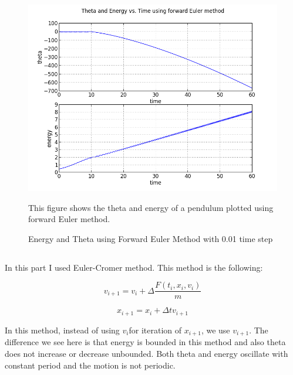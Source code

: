 \documentclass[letterpaper,12pt]{article}
\begin{document}
\FloatBarrier
\begin{figure}[h!]
\centering
\includegraphics[scale=0.7]{2_a_01.png}
\caption{Energy and Theta using Forward Euler Method with 0.01 time step}
This figure shows the theta and energy of a pendulum plotted using forward Euler method.
\end{figure}
\FloatBarrier


\subsection{}
In this part I used Euler-Cromer method.  This method is the following:

\begin{equation}
v_{i+1}=v_{i}+\Delta \frac{F(t_{i},x_{i},v_{i})}{m}
\end{equation}

\begin{equation}
x_{i+1}=x_{i}+\Delta tv_{i+1}
\end{equation}

In this method, instead of using \begin{math}v_{i} \end{math}for iteration of \begin{math}x_{i+1} \end{math}, we use \begin{math}v_{i+1} \end{math}.
The difference we see here is that energy is bounded in this method and also theta does not increase or decrease unbounded. Both theta and energy oscillate with constant period and the motion is not periodic.
\end{document}
